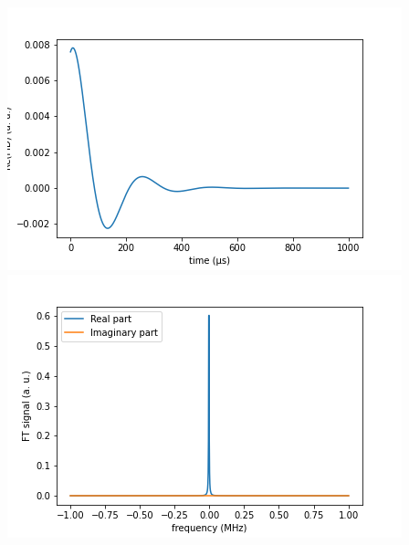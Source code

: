 \documentclass[10pt]{beamer}
\begin{document}
\begin{frame}
\begin{columns}[T]
\begin{column}{.5\textwidth}
\begin{column}{.5\textwidth}
\end{column}
\end{column}
\begin{column}{.5\textwidth}
\includegraphics[width=\textwidth]{./spin1-2/11uncorrelated_mixed_no_interactions/FIDSignal.png}
\includegraphics[width=\textwidth]{./spin1-2/11uncorrelated_mixed_no_interactions/FTSignal.png}
\end{column}
\end{columns}
\end{frame}
\end{document}
